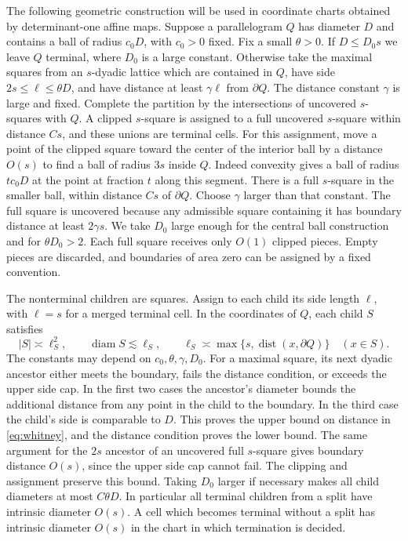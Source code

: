 \documentclass[11pt]{article}
\newcommand{\diam}{\operatorname{diam}}
\newcommand{\dist}{\operatorname{dist}}
\begin{document}
The following geometric construction will be used in coordinate
charts obtained by determinant-one affine maps.
Suppose a parallelogram \(Q\) has diameter \(D\) and contains a ball
of radius \(c_0D\), with \(c_0>0\) fixed. Fix a small
\(\theta>0\). If \(D\le D_0s\) we leave \(Q\) terminal,
where \(D_0\) is a large constant.
Otherwise take the maximal squares from an \(s\)-dyadic lattice
which are contained in \(Q\), have side \(2s\le\ell\le\theta D\),
and have distance at least \(\gamma\ell\) from \(\partial Q\).
The distance constant \(\gamma\) is large and fixed.
Complete the partition by the intersections of uncovered
\(s\)-squares with \(Q\). A clipped \(s\)-square is assigned to
a full uncovered \(s\)-square within distance \(Cs\), and these
unions are terminal cells. For this assignment, move a point of
the clipped square toward the center of the interior ball by
a distance \(O(s)\) to find a ball of radius \(3s\) inside \(Q\).
Indeed convexity gives a ball of radius \(t c_0D\) at the
point at fraction \(t\) along this segment. There is a full
\(s\)-square in the smaller ball, within distance \(Cs\) of
\(\partial Q\). Choose \(\gamma\) larger than that constant.
The full square is uncovered because any admissible square
containing it has boundary distance at least \(2\gamma s\).
We take \(D_0\) large enough for the central ball
construction and for \(\theta D_0>2\). Each full square receives
only \(O(1)\) clipped pieces. Empty pieces are discarded, and
boundaries of area zero can be assigned by a fixed convention.

The nonterminal children are squares. Assign to each child its
side length \(\ell\), with \(\ell=s\) for a merged terminal cell.
In the coordinates of \(Q\), each child \(S\) satisfies
\begin{equation}\label{eq:whitney}
 |S|\asymp\ell_S^2,\qquad
 \diam S\lesssim\ell_S,\qquad
 \ell_S\asymp \max\{s,\dist(x,\partial Q)\}\quad(x\in S).
\end{equation}
The constants may depend on \(c_0,\theta,\gamma,D_0\).
For a maximal square, its next dyadic ancestor either meets the
boundary, fails the distance condition, or exceeds the upper
side cap. In the first two cases the ancestor's diameter bounds
the additional distance from any point in the child to the
boundary. In the third case the child's side is comparable to
\(D\). This proves the upper bound on distance in
\eqref{eq:whitney}, and the distance condition proves the lower
bound. The same argument for the \(2s\) ancestor of an uncovered
full \(s\)-square gives boundary distance \(O(s)\), since the
upper side cap cannot fail. The clipping and assignment preserve
this bound. Taking \(D_0\) larger if necessary makes all child diameters
at most \(C\theta D\). In particular all terminal children from
a split have intrinsic diameter \(O(s)\).
A cell which becomes terminal without a split has intrinsic
diameter \(O(s)\) in the chart in which termination is decided.
\end{document}
